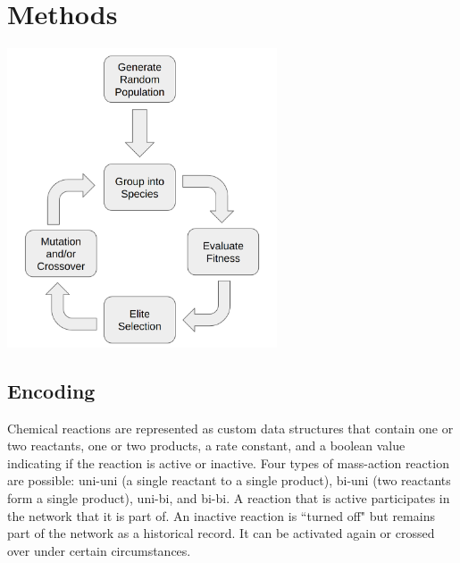 \documentclass[12pt]{report}
\begin{document}
\section{Methods}

\begin{center}
    \includegraphics[width=8cm]{images/algo_description_crossover.png}
    \label{fig:algo_description_crossover}
\end{center}
\subsection{Encoding}
Chemical reactions are represented as custom data structures that contain one or two reactants, one or two products, a rate constant, and a boolean value indicating if the reaction is active or inactive. Four types of mass-action reaction are possible: uni-uni (a single reactant to a single product), bi-uni (two reactants form a single product), uni-bi, and bi-bi. A reaction that is active participates in the network that it is part of. An inactive reaction is ``turned off" but remains part of the network as a historical record. It can be activated again or crossed over under certain circumstances. 
\end{document}
